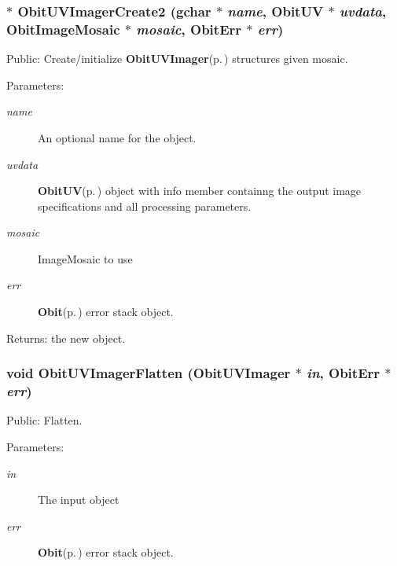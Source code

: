 \subsubsection{$\ast$ Obit\-UVImager\-Create2 (gchar $\ast$ {\em name}, {\bf Obit\-UV} $\ast$ {\em uvdata}, {\bf Obit\-Image\-Mosaic} $\ast$ {\em mosaic}, {\bf Obit\-Err} $\ast$ {\em err})}\label{ObitUVImager_8c_a12}


Public: Create/initialize {\bf Obit\-UVImager}{\rm (p.\,\pageref{structObitUVImager})} structures given mosaic. 

\begin{Desc}
\item[Parameters:]
\begin{description}
\item[{\em name}]An optional name for the object. \item[{\em uvdata}]{\bf Obit\-UV}{\rm (p.\,\pageref{structObitUV})} object with info member containng the output image specifications and all processing parameters. \item[{\em mosaic}]Image\-Mosaic to use \item[{\em err}]{\bf Obit}{\rm (p.\,\pageref{structObit})} error stack object. \end{description}
\end{Desc}
\begin{Desc}
\item[Returns:]the new object. \end{Desc}
\subsubsection{\setlength{\rightskip}{0pt plus 5cm}void Obit\-UVImager\-Flatten ({\bf Obit\-UVImager} $\ast$ {\em in}, {\bf Obit\-Err} $\ast$ {\em err})}\label{ObitUVImager_8c_a15}


Public: Flatten. 

\begin{Desc}
\item[Parameters:]
\begin{description}
\item[{\em in}]The input object \item[{\em err}]{\bf Obit}{\rm (p.\,\pageref{structObit})} error stack object. \end{description}
\end{Desc}
